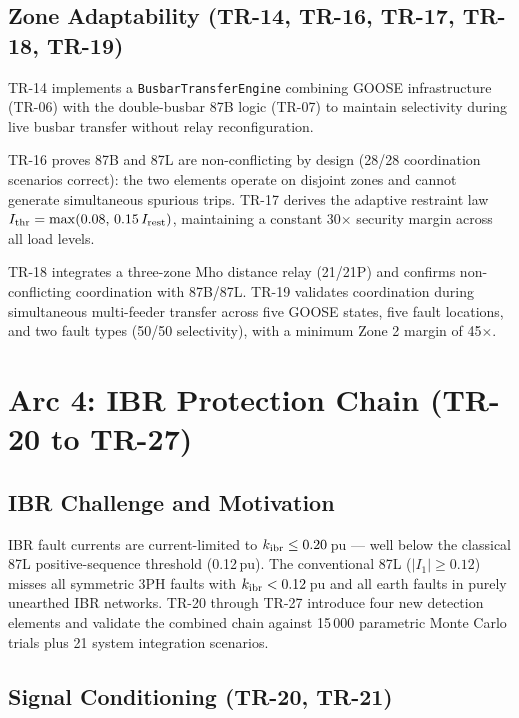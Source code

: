 \documentclass[11pt,a4paper]{article}
\begin{document}
\subsection{Zone Adaptability (TR-14, TR-16, TR-17, TR-18, TR-19)}

TR-14 implements a \texttt{BusbarTransferEngine} combining GOOSE infrastructure
(TR-06) with the double-busbar 87B logic (TR-07) to maintain selectivity
during live busbar transfer without relay reconfiguration.

TR-16 proves 87B and 87L are non-conflicting by design (28/28 coordination
scenarios correct): the two elements operate on disjoint zones and cannot
generate simultaneous spurious trips.  TR-17 derives the adaptive restraint
law $I_{\rm thr} = \max(0.08,\,0.15\,I_{\rm rest})$, maintaining a constant
30$\times$ security margin across all load levels.

TR-18 integrates a three-zone Mho distance relay (21/21P) and confirms
non-conflicting coordination with 87B/87L.  TR-19 validates coordination
during simultaneous multi-feeder transfer across five GOOSE states, five
fault locations, and two fault types (50/50 selectivity), with a minimum
Zone 2 margin of 45$\times$.

\section{Arc 4: IBR Protection Chain (TR-20 to TR-27)}

\subsection{IBR Challenge and Motivation}

IBR fault currents are current-limited to $k_{\rm ibr} \leq 0.20$\,pu —
well below the classical 87L positive-sequence threshold (0.12\,pu).  The
conventional 87L ($|I_1| \geq 0.12$) misses all symmetric 3PH faults with
$k_{\rm ibr} < 0.12$\,pu and all earth faults in purely unearthed IBR
networks.  TR-20 through TR-27 introduce four new detection elements and
validate the combined chain against 15\,000 parametric Monte Carlo trials
plus 21 system integration scenarios.

\subsection{Signal Conditioning (TR-20, TR-21)}
\end{document}
